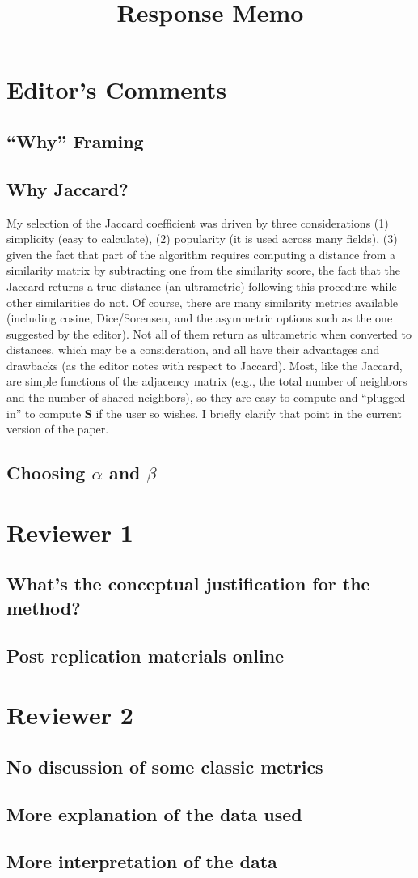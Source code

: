 \documentclass[11pt]{article}
\begin{document}
\title{Response Memo}
\maketitle
\section{Editor's Comments}
\subsection{``Why'' Framing}
\subsection{Why Jaccard?}
My selection of the Jaccard coefficient was driven by three considerations (1) simplicity (easy to calculate), (2) popularity (it is used across many fields), (3) given the fact that part of the algorithm requires computing a distance from a similarity matrix by subtracting one from the similarity score, the fact that the  Jaccard returns a true distance (an ultrametric) following this procedure while other similarities do not. Of course, there are many similarity metrics available (including cosine, Dice/Sorensen, and the asymmetric options such as the one suggested by the editor). Not all of them return as ultrametric when converted to distances, which may be a consideration, and all have their advantages and drawbacks (as the editor notes with respect to Jaccard). Most, like the Jaccard, are simple functions of the adjacency matrix (e.g., the total number of neighbors and the number of shared neighbors), so they are easy to compute and ``plugged in'' to compute $\mathbf{S}$ if the user so wishes. I briefly clarify that point in the current version of the paper. 
\subsection{Choosing $\alpha$ and $\beta$}
\section{Reviewer 1}
\subsection{What's the conceptual justification for the method?}
\subsection{Post replication materials online}
\section{Reviewer 2}
\subsection{No discussion of some classic metrics}
\subsection{More explanation of the data used}
\subsection{More interpretation of the data}
\end{document}
